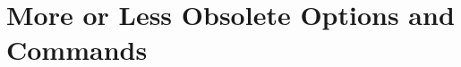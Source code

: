 \section{More or Less Obsolete Options and Commands}
\label{sec:maincls-experts.obsolete}


\endinput

